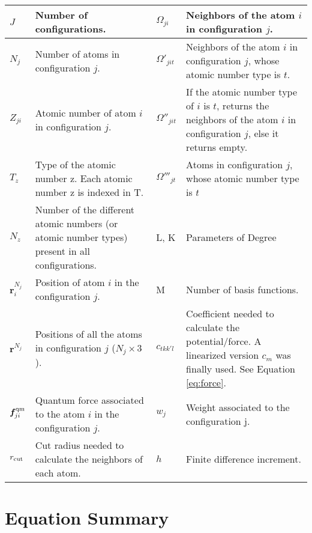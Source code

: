 \documentclass[12pt]{article}
\begin{document}
\begin{center}
    \label{table:def}
    \begin{tabular}{ | l | p{7.5cm} | l | p{7.5cm} |}
    \hline
    $J$ & Number of configurations. & $\Omega_{ji}$ & Neighbors of the atom $i$ in configuration $j$. \\ \hline
    
    $N_j$ & Number of atoms in configuration $j$. & $\Omega'_{jit}$ & Neighbors of the atom $i$ in configuration $j$, whose atomic number type is $t$. \\ \hline
    
    $Z_{ji}$ & Atomic number of atom $i$ in configuration $j$. & $\Omega''_{jit}$ & If the atomic number type of $i$ is $t$, returns the neighbors of the atom $i$ in configuration $j$, else it returns empty. \\ \hline
    
    $T_z$ & Type of the atomic number z. Each atomic number z is indexed in T. & $\Omega'''_{jt}$ & Atoms in configuration $j$, whose atomic number type is $t$ \\ \hline
    
    $N_z$ & Number of the different atomic numbers (or atomic number types) present in all configurations. &  L, K & Parameters of Degree \\ \hline
    
    $\bm {r}^{N_j}_{i}$ & Position of atom $i$ in the configuration $j$. & M & Number of basis functions.\\ \hline
    
    $\bm {r}^{N_j}$ & Positions of all the atoms in configuration $j$ ($N_j \times 3$). & $c_{tkk'l}$  & Coefficient needed to calculate the potential/force. A linearized version $c_{m}$ was finally used. See Equation \ref{eq:force}.\\ \hline %
    
    $\bm f^{\rm qm}_{ji}$ & Quantum force associated to the atom $i$ in the configuration $j$. & $w_j$ & Weight associated to the configuration j. \\ \hline
    
    $r_{\rm cut}$ & Cut radius needed to calculate the neighbors of each atom. &  $h$ & Finite difference increment. \\
    \hline
    \end{tabular}
\end{center}

\section{Equation Summary}
\end{document}
